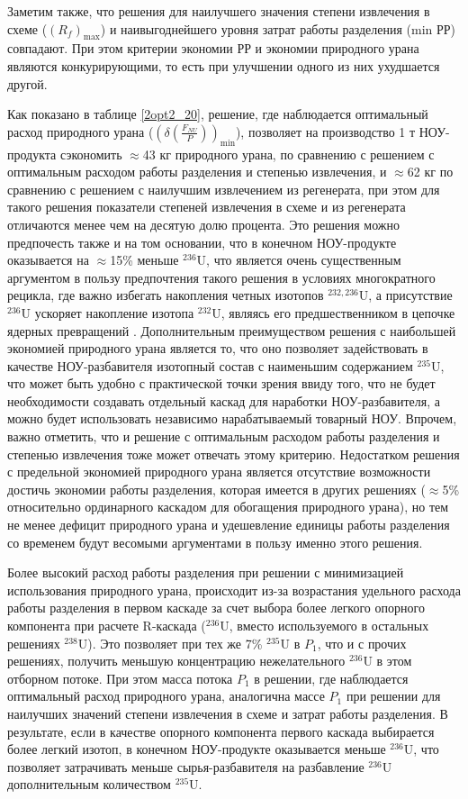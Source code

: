 Заметим также, что решения для наилучшего значения степени извлечения в схеме ($(R_{f})_\text{max}$) и наивыгоднейшего уровня затрат работы разделения (min РР) совпадают. При этом критерии экономии РР и экономии природного урана являются конкурирующими, то есть при улучшении одного из них ухудшается другой.

Как показано в таблице \ref{2opt2_20}, решение, где наблюдается оптимальный расход природного урана ($(\delta(\frac{F_{NU}}{P}))_\text{min}$), позволяет на производство 1 т НОУ-продукта сэкономить $\approx$43 кг природного урана, по сравнению с решением с оптимальным расходом работы разделения и степенью извлечения, и $\approx$62 кг по сравнению с решением с наилучшим извлечением из регенерата, при этом для такого решения показатели степеней извлечения в схеме и из регенерата отличаются менее чем на десятую долю процента. Это решения можно предпочесть также и на том основании, что в конечном НОУ-продукте оказывается на $\approx$15\% меньше $^{236}$U, что является очень существенным аргументом в пользу предпочтения такого решения в условиях многократного рецикла, где важно избегать накопления четных изотопов $^{232,236}$U, а присутствие $^{236}$U ускоряет накопление изотопа $^{232}$U, являясь его предшественником в цепочке ядерных превращений \cite{smirnovEvolutionIsotopicComposition2012}. Дополнительным преимуществом решения с наибольшей экономией природного урана является то, что оно позволяет задействовать в качестве НОУ-разбавителя изотопный состав с наименьшим содержанием $^{235}$U, что может быть удобно с практической точки зрения ввиду того, что не будет необходимости создавать отдельный каскад для наработки НОУ-разбавителя, а можно будет использовать независимо нарабатываемый товарный НОУ. Впрочем, важно отметить, что и решение с оптимальным расходом работы разделения и степенью извлечения тоже может отвечать этому критерию. Недостатком решения с предельной экономией природного урана является отсутствие возможности достичь экономии работы разделения, которая имеется в других решениях ($\approx$5\% относительно ординарного каскадом для обогащения природного урана), но тем не менее дефицит природного урана и удешевление единицы работы разделения со временем будут весомыми аргументами в пользу именно этого решения.

Более высокий расход работы разделения при решении с минимизацией использования природного урана, происходит из-за возрастания удельного расхода работы разделения в первом каскаде за счет выбора более легкого опорного компонента при расчете R-каскада ($^{236}$U, вместо используемого в остальных решениях $^{238}$U). Это позволяет при тех же 7\% $^{235}$U в $P_{1}$, что и с прочих решениях, получить меньшую концентрацию нежелательного $^{236}$U в этом отборном потоке. При этом масса потока $P_{1}$ в решении, где наблюдается оптимальный расход природного урана, аналогична массе $P_{1}$ при решении для наилучших значений степени извлечения в схеме и затрат работы разделения. В результате, если в качестве опорного компонента первого каскада выбирается более легкий изотоп, в конечном НОУ-продукте оказывается меньше $^{236}$U, что позволяет затрачивать меньше сырья-разбавителя на разбавление $^{236}$U дополнительным количеством $^{235}$U.

